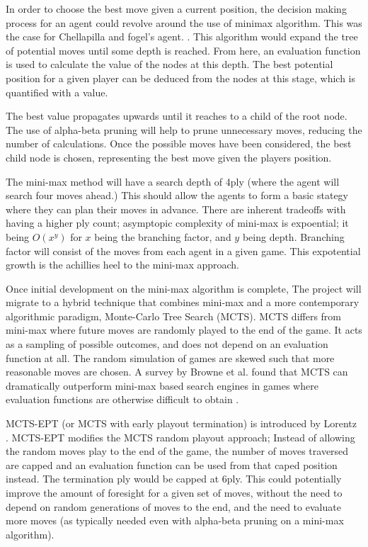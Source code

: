 \documentclass[12pt,a4paper]{article}
\begin{document}
    In order to choose the best move given a current position, the decision making process for an agent could revolve around the use of minimax algorithm. This was the case for Chellapilla and fogel's agent. \cite{chellapilla_evolving_1999}. This algorithm would expand the tree of potential moves until some depth is reached. From here, an evaluation function is used to calculate the value of the nodes at this depth. The best potential position for a given player can be deduced from the nodes at this stage, which is quantified with a value.

    The best value propagates upwards until it reaches to a child of the root node. The use of alpha-beta pruning will help to prune unnecessary moves,  reducing the number of calculations. Once the possible moves have been considered, the best child node is chosen, representing the best move given  the players position.

    The mini-max method will have a search depth of 4ply (where the agent will search four moves ahead.) This should allow the agents to form a basic stategy where they can plan their moves in advance. There are inherent tradeoffs with having a higher ply count; asymptopic complexity of mini-max is expoential; it being $O(x^y)$ for $x$ being the branching factor, and $y$ being depth. Branching factor will consist of the moves from each agent in a given game. This expotential growth is the achillies heel to the mini-max approach.

    Once initial development on the mini-max algorithm is complete, The project will migrate to a hybrid technique that combines mini-max and a more contemporary algorithmic paradigm, Monte-Carlo Tree Search (MCTS). MCTS differs from mini-max where future moves are randomly played to the end of the game. It acts as a sampling of possible outcomes, and does not depend on an evaluation function at all. The random simulation of games are skewed such that more reasonable moves are chosen. A survey by Browne et al. found that MCTS can dramatically outperform mini-max based search engines in games where evaluation functions are otherwise difficult to obtain \cite{browne_survey_2012}.

    MCTS-EPT (or MCTS with early playout termination) is introduced by Lorentz \cite{lorentz_using_2016}. MCTS-EPT modifies the MCTS random playout approach; Instead of allowing the random moves play to the end of the game, the number of moves traversed are capped and an evaluation function can be used from that caped position instead. The termination ply would be capped at 6ply. This could potentially improve the amount of foresight for a given set of moves, without the need to depend on random generations of moves to the end, and the need to evaluate more moves (as typically needed even with alpha-beta pruning on a mini-max algorithm).
    
\end{document}
